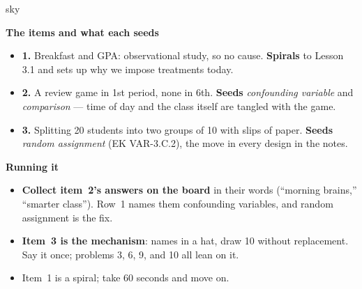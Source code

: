 \documentclass[10pt]{article}
\begin{document}
\boxguard[20]
\begin{skillbox}{sky}
\begin{minipage}[t]{0.48\linewidth}
    \textbf{The items and what each seeds}
    \begin{itemize}
        \item \textbf{1.} Breakfast and GPA: observational study, so no cause.
              \textbf{Spirals} to Lesson 3.1 and sets up why we impose treatments today.
        \item \textbf{2.} A review game in 1st period, none in 6th. \textbf{Seeds}
              \emph{confounding variable} and \emph{comparison} --- time of day and the class
              itself are tangled with the game.
        \item \textbf{3.} Splitting 20 students into two groups of 10 with slips of paper.
              \textbf{Seeds} \emph{random assignment} (EK VAR-3.C.2), the move in every
              design in the notes.
    \end{itemize}
\end{minipage}
\hfill
\begin{minipage}[t]{0.48\linewidth}
    \textbf{Running it}
    \begin{itemize}
        \item \textbf{Collect item~2's answers on the board} in their words (``morning
              brains,'' ``smarter class''). Row~1 names them confounding variables, and
              random assignment is the fix.
        \item \textbf{Item~3 is the mechanism}: names in a hat, draw 10 without replacement.
              Say it once; problems 3, 6, 9, and 10 all lean on it.
        \item Item~1 is a spiral; take 60 seconds and move on.
    \end{itemize}
\end{minipage}
\end{skillbox}
\end{document}
